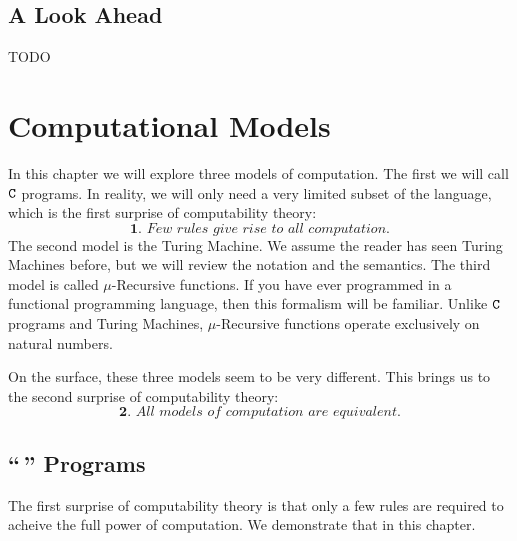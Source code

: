 \documentclass[english, 12pt]{article}
\begin{document}
  \subsection{A Look Ahead}
  TODO

  \section{Computational Models}
  In this chapter we will explore three models of computation. The first
  we will call ${\texttt{C}}$ programs. In reality, we will only need a very 
  limited subset of the language, which is the first surprise of computability
  theory:
  \[ \textbf{1. }\textit{Few rules give rise to all computation.} \]
  The second model is the Turing Machine. We assume the reader has seen
  Turing Machines before, but we will review the notation and the semantics.
  The third model is called $\mu$-Recursive functions. If you have ever
  programmed in a functional programming language, then this formalism will
  be familiar. Unlike ${\texttt{C}}$ programs and Turing Machines, $\mu$-Recursive
  functions operate exclusively on natural numbers. \n

  On the surface, these three models seem to be very different. This brings
  us to the second surprise of computability theory:
  \[ \textbf{2. } \textit{All models of computation are equivalent.} \]
  
  \subsection{``\pC\,'' Programs}
  The first surprise of computability theory is that only a few rules
  are required to acheive the full power of computation. We demonstrate
  that in this chapter. \n
\end{document}
